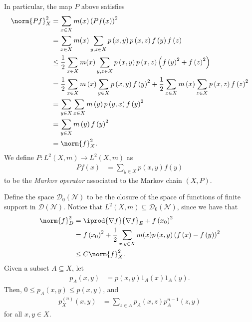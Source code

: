 \documentclass[10pt]{mypackage}
\begin{document}
In particular, the map $P$ above satisfies
\begin{align*}
  \norm{Pf}_{X}^2 &= \sum_{x\in X} m(x)\left( Pf(x) \right)^2\\
                  &= \sum_{x\in X}m(x) \sum_{y,z\in X}p\left( x,y \right)p\left( x,z \right)f\left( y \right)f\left( z \right)\\
                  &\leq \frac{1}{2}\sum_{x\in X}m(x) \sum_{y,z\in X} p\left( x,y \right)p\left( x,z \right)\left( f\left( y \right)^2 + f\left( z \right)^2 \right)\\
                  &= \frac{1}{2}\sum_{x\in X}m\left( x \right)\sum_{y\in X}p\left( x,y \right)f\left( y \right)^2 + \frac{1}{2}\sum_{x\in X}m\left( x \right)\sum_{z\in X} p\left( x,z \right)f\left( z \right)^2\\
                  &= \sum_{y\in X}\sum_{x\in X} m\left( y \right)p\left( y,x \right)f\left( y \right)^2\\
                  &= \sum_{y\in X}m\left( y \right)f\left( y \right)^2\\
                  &= \norm{f}_{X}^2.
\end{align*}
We define $P\colon L^2\left( X,m \right)\to L^2\left( X,m \right)$ as
\begin{align*}
  Pf\left( x \right) &= \sum_{y\in X}p\left( x,y \right)f(y)
\end{align*}
to be the \textit{Markov operator} associated to the Markov chain $\left( X,P \right)$.

Define the space $\mathcal{D}_0\left( \mathcal{N} \right)$ to be the closure of the space of functions of finite support in $ \mathcal{D}\left( \mathcal{N} \right) $. Notice that $L^2\left( X,m \right)\subseteq \mathcal{D}_0\left( \mathcal{N} \right)$, since we have that
\begin{align*}
  \norm{f}_{D}^2 &= \iprod{\nabla f}{\nabla f}_{E} + f\left( x_0 \right)^2\\
                 &= f\left( x_0 \right)^2 + \frac{1}{2}\sum_{x,y\in X} m(x)p\left( x,y \right)\left( f\left( x \right)-f\left( y \right) \right)^2\\
                 &\leq C\norm{f}_{X}^2.
\end{align*}
Given a subset $A\subseteq X$, let
\begin{align*}
  p_A\left( x,y \right) &= p\left( x,y \right)1_{A}(x)1_A(y).
\end{align*}
Then, $0\leq p_A\left( x,y \right)\leq p\left( x,y \right)$, and
\begin{align*}
  p^{(n)}_{X}\left( x,y \right) &= \sum_{z\in A} p_A\left( x,z \right)p_{A}^{n-1}\left( z,y \right)
\end{align*}
for all $x,y\in X$.
\end{document}
